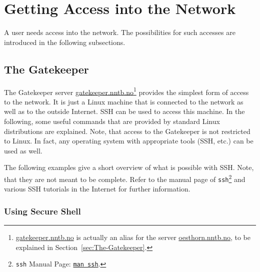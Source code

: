 \section{Getting Access into the  Network}
\label{sec:Access-into-NorNet-Core-Network}

A  user needs access into the  network. The possibilities for such accesses are introduced in the following subsections.


\subsection{The Gatekeeper}
\label{sub:The-Gatekeeper}

The Gatekeeper server \href{ssh://gatekeeper.nntb.no}{gatekeeper.nntb.no}\footnote{\href{ssh://gatekeeper.nntb.no}{gatekeeper.nntb.no} is actually an alias for the server \href{ssh://oesthorn.nntb.no}{oesthorn.nntb.no}, to be explained in Section~\ref{sec:The-Gatekeeper}.} provides the simplest form of access to the  network. It is just a Linux machine that is connected to the  network as well as to the outside Internet. SSH can be used to access this machine. In the following, some useful commands that are provided by standard Linux distributions are explained. Note, that access to the Gatekeeper is not restricted to Linux. In fact, any operating system with appropriate tools (SSH, etc.) can be used as well.

The following examples give a short overview of what is possible with SSH. Note, that they are not meant to be complete. Refer to the manual page of \texttt{ssh}\footnote{\texttt{ssh} Manual Page: \texttt{\href{man:ssh}{man ssh}}.} and various SSH tutorials in the Internet for further information.


\subsubsection{Using Secure Shell}
\label{subsub:Gatekeeper-Using-SSH}

